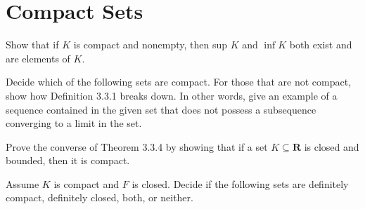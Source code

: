 \section{Compact Sets}

\begin{exercise}
  Show that if $K$ is compact and nonempty, then sup $K$ and $\inf K$ both exist and are elements of $K$.
\end{exercise}

\begin{solution}
  \TODO
\end{solution}

\begin{exercise}
  Decide which of the following sets are compact. For those that are not compact, show how Definition 3.3.1 breaks down. In other words, give an example of a sequence contained in the given set that does not possess a subsequence converging to a limit in the set.
\end{exercise}

\begin{solution}
  \enum{
  \item \TODO
  \item \TODO
  \item \TODO
  \item \TODO
  \item \TODO
  }
\end{solution}

\begin{exercise}
  Prove the converse of Theorem 3.3.4 by showing that if a set $K \subseteq \mathbf{R}$ is closed and bounded, then it is compact.
\end{exercise}

\begin{solution}
  \TODO
\end{solution}

\begin{exercise}
  Assume $K$ is compact and $F$ is closed. Decide if the following sets are definitely compact, definitely closed, both, or neither.
\end{exercise}

